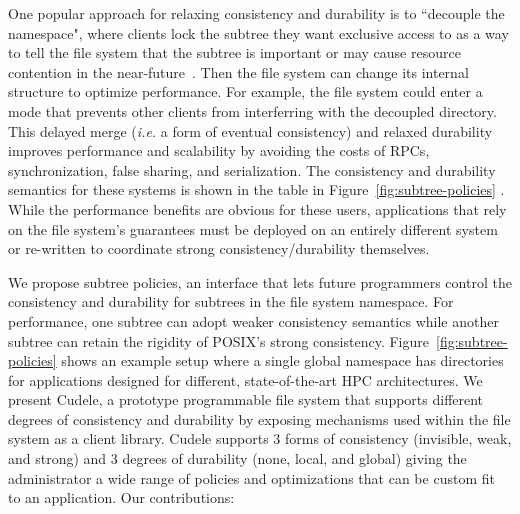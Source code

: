 One popular approach for relaxing consistency and durability is to ``decouple
the namespace", where clients lock the subtree they want exclusive access to as
a way to tell the file system that the subtree is important or may cause
resource contention in the near-future~\cite{grider:pdsw2015-marfs,
zheng:pdsw2015-deltafs, zheng:pdsw2014-batchfs, ren:sc2014-indexfs,
bent:slides-twotiers}. Then the file system can change its internal structure
to optimize performance. For example, the file system could enter a mode that
prevents other clients from interferring with the decoupled directory.  This
delayed merge ({\it i.e.} a form of eventual consistency) and relaxed
durability improves performance and scalability by avoiding the costs of RPCs,
synchronization, false sharing, and serialization.  The consistency and
durability semantics for these systems is shown in the table in
Figure~\ref{fig:subtree-policies} . While the performance benefits are obvious
for these users, applications that rely on the file system's guarantees must be
deployed on an entirely different system or re-written to coordinate strong
consistency/durability themselves.

%

We propose subtree policies, an interface that lets future programmers control
the consistency and durability for subtrees in the file system namespace. For performance, one
subtree can adopt weaker consistency semantics while another subtree can retain
the rigidity of POSIX's strong consistency. Figure~\ref{fig:subtree-policies}
shows an example setup where a single global namespace has directories for
applications designed for different, state-of-the-art HPC architectures.  We
present Cudele, a prototype programmable file system that supports different
degrees of consistency and durability by exposing mechanisms used within the
file system as a client library.  Cudele supports 3 forms of consistency
(invisible, weak, and strong) and 3 degrees of durability (none, local, and
global) giving the administrator a wide range of policies and optimizations
that can be custom fit to an application. Our contributions: 

